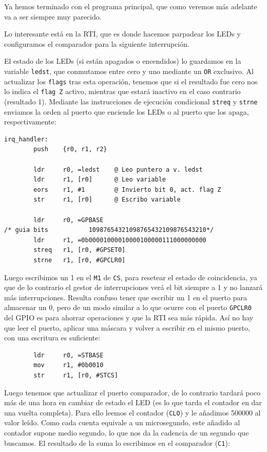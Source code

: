 Ya hemos terminado con el programa principal, que como veremos más adelante va a ser
siempre muy parecido.

Lo interesante está en la RTI, que es donde hacemos parpadear los LEDs y configuramos
el comparador para la siguiente interrupción.

El estado de los LEDs (si están apagados o encendidos) lo guardamos en la variable
{\tt ledst}, que conmutamos entre cero y uno mediante un {\tt OR} exclusivo. Al
actualizar los {\tt flags} tras esta operación, tenemos que si el resultado fue
cero nos lo indica el {\tt flag Z} activo, mientras que estará inactivo en el
caso contrario (resultado 1). Mediante las instrucciones de ejecución condicional
{\tt streq} y {\tt strne} enviamos la orden al puerto que enciende los LEDs o al
puerto que los apaga, respectivamente:

\begin{lstlisting}
irq_handler:
        push    {r0, r1, r2}

        ldr     r0, =ledst    @ Leo puntero a v. ledst
        ldr     r1, [r0]      @ Leo variable
        eors    r1, #1        @ Invierto bit 0, act. flag Z
        str     r1, [r0]      @ Escribo variable

        ldr     r0, =GPBASE
/* guia bits           10987654321098765432109876543210*/
        ldr     r1, =0b00001000010000100000111000000000
        streq   r1, [r0, #GPSET0]
        strne   r1, [r0, #GPCLR0]
\end{lstlisting}

Luego escribimos un 1 en el {\tt M1} de {\tt CS}, para resetear el estado de coincidencia, ya
que de lo contrario el gestor de interrupciones verá el bit siempre a 1 y no lanzará más
interrupciones. Resulta confuso tener que escribir un 1 en el puerto para almacenar un 0, pero
de un modo similar a lo que ocurre con el puerto {\tt GPCLR0} del GPIO es para ahorrar
operaciones y que la RTI sea más rápida. Así no hay que leer el puerto, aplicar una máscara y
volver a escribir en el mismo puerto, con una escritura es suficiente:

\begin{lstlisting}
        ldr     r0, =STBASE
        mov     r1, #0b0010
        str     r1, [r0, #STCS]
\end{lstlisting}

Luego tenemos que actualizar el puerto comparador, de lo contrario tardará poco más
de una hora en cambiar de estado el LED (es lo que tarda el contador en dar una vuelta
completa). Para ello leemos el contador ({\tt CLO}) y le añadimos 500000 al valor leído. Como cada
cuenta equivale a un microsegundo, este añadido al contador supone medio segundo, lo
que nos da la cadencia de un segundo que buscamos. El resultado de la suma lo escribimos
en el comparador ({\tt C1}):

